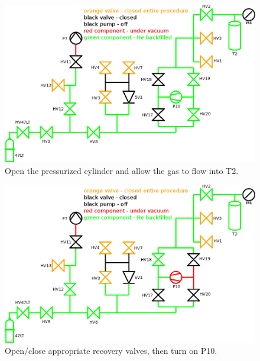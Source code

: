 \documentclass[a4paper,10pt]{article}
\begin{document}
\begin{figure}[htbp!]
 \centering
 \includegraphics[width=\textwidth]{./he-3-transfer-06-open-hv47lt.png}
 \caption{Open the pressurized cylinder and allow the gas to flow into T2.}
 \label{d}
\end{figure}
\begin{figure}[htbp!]
 \centering
 \includegraphics[width=\textwidth]{./he-3-transfer-07-turn-on-p10.png}
 \caption{Open/close appropriate recovery valves, then turn on P10.}
 \label{e}
\end{figure}
\end{document}
